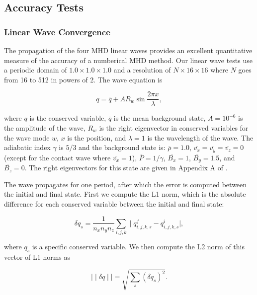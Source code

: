 \documentclass[modern, linenumbers]{aastex631}
\begin{document}
\subsection{Accuracy Tests}
\label{sec:accuracy_tests}

\subsubsection{Linear Wave Convergence}
\label{sec:lwc}

The propagation of the four MHD linear waves provides an excellent quantitative measure of the accuracy of a numberical MHD method. Our linear wave tests use a periodic domain of $1.0\times1.0\times1.0$ and a resolution of $N\times16\times16$ where $N$ goes from 16 to 512 in powers of 2. The wave equation is

\begin{equation}
    q = \overline{q} + A R_w \sin{\frac{2\pi x}{\lambda}},
\end{equation}

\noindent where $q$ is the conserved variable, $\overline{q}$ is the mean background state, $A=10^{-6}$ is the amplitude of the wave, $R_w$ is the right eigenvector in conserved variables for the wave mode $w$, $x$ is the position, and $\lambda=1$ is the wavelength of the wave. The adiabatic index $\gamma$ is $5/3$ and the background state is:
$\overline{\rho}=1.0$,
$\overline{v_x}=\overline{v_y}=\overline{v_z}=0$ (except for the contact wave where $\overline{v_x} = 1$),
$\overline{P}=1/\gamma$,
$\overline{B_x}=1$,
$\overline{B_y}=1.5$,
and $\overline{B_z}=0$.
The right eigenvectors for this state are given in Appendix A of \cite{gardiner_unsplit_2008}.

The wave propagates for one period, after which the error is computed between the initial and final state. First we compute the L1 norm, which is the absolute difference for each conserved variable between the initial and final state:

\begin{equation}
    \delta q_s = \frac{1}{n_x n_y n_z} \sum_{i,j,k} \mid q^f_{i,j,k,s} - q^i_{i,j,k,s} \mid,
\end{equation}

\noindent where $q_s$ is a specific conserved variable. We then compute the L2 norm of this vector of L1 norms as

\begin{equation}
    \mid \mid \delta q \mid \mid = \sqrt{\sum_s \left( \delta q_s \right)^2}.
\end{equation}
\end{document}
